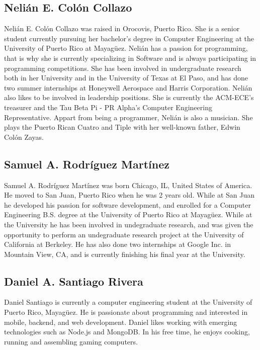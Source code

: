 \label{sec:bios}

\subsection{Nelián E. Colón Collazo}
Nelián E. Colón Collazo was raised in Orocovis, Puerto Rico. She is a senior student currently pursuing her bachelor's degree in Computer Engineering at the University of Puerto Rico at Mayagüez. Nelián has a passion for programming, that is why she is currently specializing in Software and is always participating in programming competitions. She has been involved in undergraduate research both in her University and in the University of Texas at El Paso, and has done two summer internships at Honeywell Aerospace and Harris Corporation. Nelián also likes to be involved in leadership positions. She is currently the ACM-ECE's treasurer and the Tau Beta Pi - PR Alpha's Computer Engineering Representative. Appart from being a programmer, Nelián is also a musician. She plays the Puerto Rican Cuatro and Tiple with her well-known father, Edwin Colón Zayas. 

\subsection{Samuel A. Rodríguez Martínez}
Samuel A. Rodríguez Martínez was born Chicago, IL, United States of America. He moved to San Juan,
Puerto Rico when he was 2 years old. While at San Juan he developed his passion for software
development, and enrolled for a Computer Engineering B.S. degree at the University of Puerto Rico at
Mayagüez. While at the University he has been involved in undegraduate research, and was given the
opportunity to perform an undegraduate research project at the University of California at Berkeley.
He has also done two internships at Google Inc. in Mountain View, CA, and is currently finishing his
final year at the University.

\subsection{Daniel A. Santiago Rivera}
Daniel Santiago is currently a computer engineering student at the University of Puerto Rico, Mayagüez. He is passionate about programming and interested in mobile, backend, and web development. Daniel likes working with emerging technologies such as Node.js and MongoDB. In his free time, he enjoys cooking, running and assembling gaming computers.
